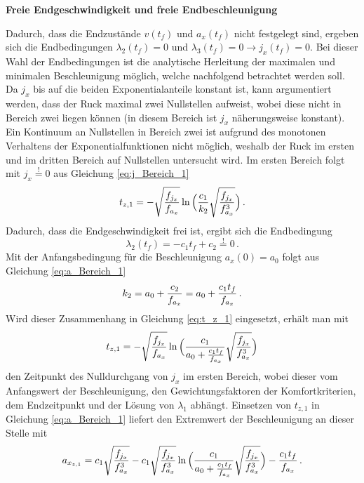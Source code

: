 \textbf{Freie Endgeschwindigkeit und freie Endbeschleunigung}

Dadurch, dass die Endzustände $v(t_f)$ und $a_x(t_f)$ nicht festgelegt sind, ergeben sich die Endbedingungen $\lambda_2(t_f) = 0$ und $\lambda_3(t_f) = 0 \rightarrow j_x(t_f) = 0$. Bei dieser Wahl der Endbedingungen ist die analytische Herleitung der maximalen und minimalen Beschleunigung möglich, welche nachfolgend betrachtet werden soll. Da $j_x$ bis auf die beiden Exponentialanteile konstant ist, kann argumentiert werden, dass der Ruck maximal zwei Nullstellen aufweist, wobei diese nicht in Bereich zwei liegen können (in diesem Bereich ist $j_x$ näherungsweise konstant). Ein Kontinuum an Nullstellen in Bereich zwei ist aufgrund des monotonen Verhaltens der Exponentialfunktionen nicht möglich, weshalb der Ruck im ersten und im dritten Bereich auf Nullstellen untersucht wird. Im ersten Bereich folgt mit $j_x \stackrel{!}{=} 0$ aus Gleichung \eqref{eq:j_Bereich_1}
\begin{equation}
	t_{z,1} = -\sqrt{\frac{f_{j_x}}{f_{a_x}}}\ln{\Big(\frac{c_1}{k_2}\sqrt{\frac{\ensuremath{f_{j_x}}}{\ensuremath{f_{a_x}}^3}}\Big)}\,. \label{eq:t_z_1}
\end{equation}
Dadurch, dass die Endgeschwindigkeit frei ist, ergibt sich die Endbedingung 
\begin{equation}
	\lambda_2(t_f) = -c_1t_f + c_2 \stackrel{!}{=} 0\,.
\end{equation}
Mit der Anfangsbedingung für die Beschleunigung $a_x(0) = a_0$ folgt aus Gleichung \eqref{eq:a_Bereich_1}
\begin{equation}
k_2 = a_0 + \frac{c_2}{f_{a_x}} = a_0 + \frac{c_1t_f}{f_{a_x}}\,.
\end{equation}
Wird dieser Zusammenhang in Gleichung \eqref{eq:t_z_1} eingesetzt, erhält man mit 
\begin{equation}
t_{z,1} = -\sqrt{\frac{f_{j_x}}{f_{a_x}}}\ln{\Big(\frac{c_1}{a_0+\frac{c_1t_f}{\ensuremath{f_{a_x}}}}\sqrt{\frac{\ensuremath{f_{j_x}}}{\ensuremath{f_{a_x}}^3}}\Big)}
\end{equation}
den Zeitpunkt des Nulldurchgang von $j_x$ im ersten Bereich, wobei dieser vom Anfangswert der Beschleunigung, den Gewichtungsfaktoren der Komfortkriterien, dem Endzeitpunkt und der Lösung von $\lambda_1$ abhängt. Einsetzen von $t_{z,1}$ in Gleichung \eqref{eq:a_Bereich_1} liefert den Extremwert der Beschleunigung an dieser Stelle mit 
\begin{equation}
a_{x_{z,1}} = c_1\sqrt{\frac{f_{j_x}}{f_{a_x}^3}} -c_1\sqrt{\frac{f_{j_x}}{f_{a_x}^3}}\ln{\Big(\frac{c_1}{a_0+\frac{c_1t_f}{\ensuremath{f_{a_x}}}}\sqrt{\frac{\ensuremath{f_{j_x}}}{\ensuremath{f_{a_x}}^3}}\Big)} - \frac{c_1t_f}{f_{a_x}}\,. 
\end{equation}
